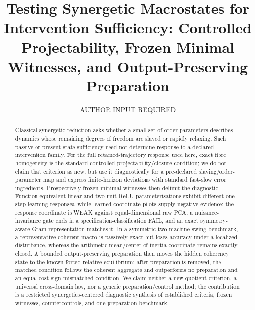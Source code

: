 \documentclass[aip,cha,reprint,amsmath,amssymb]{revtex4-2}
\begin{document}
\title{Testing Synergetic Macrostates for Intervention Sufficiency: Controlled Projectability, Frozen Minimal Witnesses, and Output-Preserving Preparation}

\author{AUTHOR INPUT REQUIRED}

\begin{abstract}
Classical synergetic reduction asks whether a small set of order parameters describes dynamics whose remaining degrees of freedom are slaved or rapidly relaxing. Such passive or present-state sufficiency need not determine response to a declared intervention family. For the full retained-trajectory response used here, exact fibre homogeneity is the standard controlled-projectability/closure condition; we do not claim that criterion as new, but use it diagnostically for a pre-declared slaving/order-parameter map and express finite-horizon deviations with standard fast-slow error ingredients. Prospectively frozen minimal witnesses then delimit the diagnostic. Function-equivalent linear and two-unit ReLU parameterisations exhibit different one-step learning responses, while learned-coordinate pilots supply negative evidence: the response coordinate is WEAK against equal-dimensional raw PCA, a nuisance-invariance gate ends in a specification-classification FAIL, and an exact symmetry-aware Gram representation matches it. In a symmetric two-machine swing benchmark, a representative coherent macro is passively exact but loses accuracy under a localized disturbance, whereas the arithmetic mean/center-of-inertia coordinate remains exactly closed. A bounded output-preserving preparation then moves the hidden coherency state to the known forced relative equilibrium; after preparation is removed, the matched condition follows the coherent aggregate and outperforms no preparation and an equal-cost sign-mismatched condition. We claim neither a new quotient criterion, a universal cross-domain law, nor a generic preparation/control method; the contribution is a restricted synergetics-centered diagnostic synthesis of established criteria, frozen witnesses, countercontrols, and one preparation benchmark.
\end{abstract}

\maketitle









\end{document}

